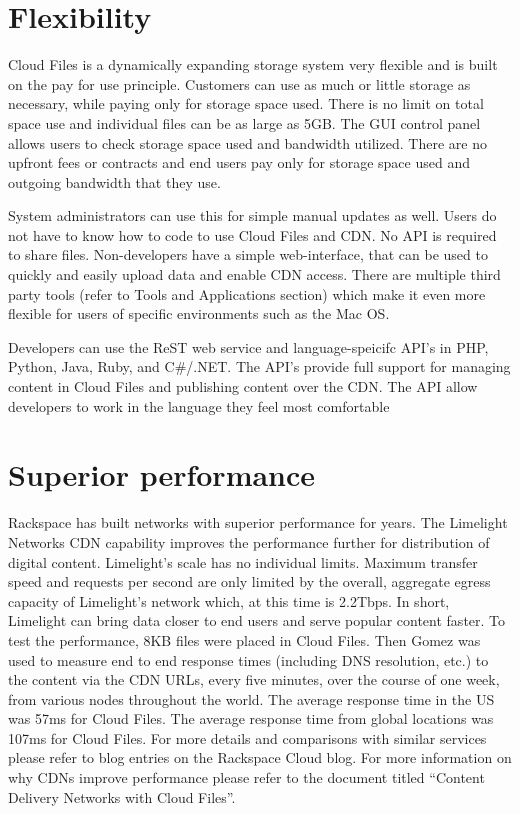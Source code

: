 \documentclass[letterpaper,10pt,english]{manual}
\begin{document}
\section{Flexibility}

Cloud Files is a dynamically expanding storage system very flexible and is
built on the pay for use principle. Customers can use as much or little
storage as necessary, while paying only for storage space used. There is
no limit on total space use and individual files can be as large as 5GB.
The GUI control panel allows users to check storage space used and
bandwidth utilized. There are no upfront fees or contracts and end users
pay only for storage space used and outgoing bandwidth that they use.

System administrators can use this for simple manual updates as well.
Users do not have to know how to code to use Cloud Files and CDN.  No API
is required to share files.  Non-developers have a simple web-interface,
that can be used to quickly and easily upload data and enable CDN access.
There are multiple third party tools (refer to Tools and Applications
section) which make it even more flexible for users of specific
environments such as the Mac OS.

Developers can use the ReST web service and language-speicifc API’s in
PHP, Python, Java, Ruby, and C\#/.NET.  The API's provide full support for
managing content in Cloud Files and publishing content over the CDN. The
API allow developers to work in the language they feel most comfortable


\section{Superior performance}

Rackspace has built networks with superior performance for years. The
Limelight Networks CDN capability improves the performance further for
distribution of digital content. Limelight’s scale has no individual
limits.  Maximum transfer speed and requests per second are only limited
by the overall, aggregate egress capacity of Limelight’s network which,
at this time is 2.2Tbps. In short, Limelight can bring data closer to
end users and serve popular content faster. To test the performance,
8KB files were placed in Cloud Files.  Then Gomez was used to measure
end to end response times (including DNS resolution, etc.) to the content
via the CDN URLs, every five minutes, over the course of one week, from
various nodes throughout the world.  The average response time in the US
was 57ms for Cloud Files.  The average response time from global locations
was 107ms for Cloud Files. For more details and comparisons with similar
services please refer to blog entries on the Rackspace Cloud blog. For more
information on why CDNs improve performance please refer to the document
titled “Content Delivery Networks with Cloud Files”.
\end{document}
